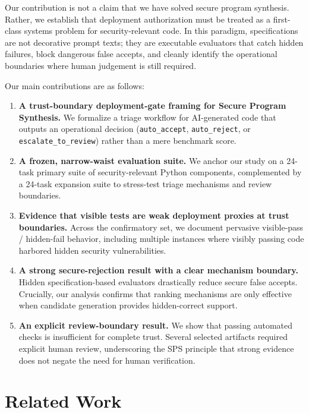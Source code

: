 \documentclass[11pt]{article}
\begin{document}
Our contribution is not a claim that we have solved secure program synthesis. Rather, we establish that deployment authorization must be treated as a first-class systems problem for security-relevant code. In this paradigm, specifications are not decorative prompt texts; they are executable evaluators that catch hidden failures, block dangerous false accepts, and cleanly identify the operational boundaries where human judgement is still required.

Our main contributions are as follows:
\begin{enumerate}[label=\arabic*.]
    \item \textbf{A trust-boundary deployment-gate framing for Secure Program Synthesis.} We formalize a triage workflow for AI-generated code that outputs an operational decision (\texttt{auto\_accept}, \texttt{auto\_reject}, or \texttt{escalate\_to\_review}) rather than a mere benchmark score.
    \item \textbf{A frozen, narrow-waist evaluation suite.} We anchor our study on a 24-task primary suite of security-relevant Python components, complemented by a 24-task expansion suite to stress-test triage mechanisms and review boundaries.
    \item \textbf{Evidence that visible tests are weak deployment proxies at trust boundaries.} Across the confirmatory set, we document pervasive visible-pass / hidden-fail behavior, including multiple instances where visibly passing code harbored hidden security vulnerabilities.
    \item \textbf{A strong secure-rejection result with a clear mechanism boundary.} Hidden specification-based evaluators drastically reduce secure false accepts. Crucially, our analysis confirms that ranking mechanisms are only effective when candidate generation provides hidden-correct support.
    \item \textbf{An explicit review-boundary result.} We show that passing automated checks is insufficient for complete trust. Several selected artifacts required explicit human review, underscoring the SPS principle that strong evidence does not negate the need for human verification.
\end{enumerate}

\section{Related Work}
\end{document}

